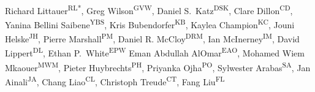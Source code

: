 \documentclass[10pt,letterpaper]{article}
\begin{document}
\vspace*{0.2in}

\begin{flushleft}
{\Large
\textbf{}
}
\newline
\\
Richard Littauer\textsuperscript{RL*},
Greg Wilson\textsuperscript{GVW},
Daniel S.\ Katz\textsuperscript{DSK},
Clare Dillon\textsuperscript{CD},
Yanina Bellini Saibene\textsuperscript{YBS},
Kris Bubendorfer\textsuperscript{KB},
Kaylea Champion\textsuperscript{KC},
Jouni Helske\textsuperscript{JH},
Pierre Marshall\textsuperscript{PM},
Daniel R. McCloy\textsuperscript{DRM},
Ian McInerney\textsuperscript{IM},
David Lippert\textsuperscript{DL},
Ethan P.\ White\textsuperscript{EPW}
Eman Abdullah AlOmar\textsuperscript{EAO},
Mohamed Wiem Mkaouer\textsuperscript{MWM},
Pieter Huybrechts\textsuperscript{PH},
Priyanka Ojha\textsuperscript{PO},
Sylwester Arabas\textsuperscript{SA},
Jan Ainali\textsuperscript{JA},
Chang Liao\textsuperscript{CL},
Christoph Treude\textsuperscript{CT},
Fang Liu\textsuperscript{FL}
\\
\bigskip


\end{flushleft}
\end{document}
